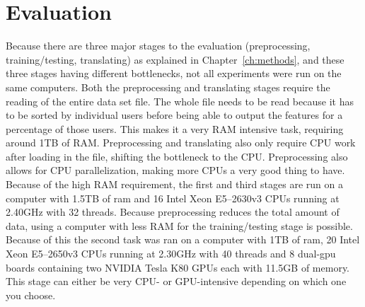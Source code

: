 \chapter{Evaluation}\label{ch:evaluation}

Because there are three major stages to the evaluation (preprocessing, training/testing, translating) as explained in Chapter~\ref{ch:methods}, and these three stages having different bottlenecks, not all experiments were run on the same computers. Both the preprocessing and translating stages require the reading of the entire data set file. The whole file needs to be read because it has to be sorted by individual users before being able to output the features for a percentage of those users. This makes it a very RAM intensive task, requiring around 1TB of RAM. Preprocessing and translating also only require CPU work after loading in the file, shifting the bottleneck to the CPU. Preprocessing also allows for CPU parallelization, making more CPUs a very good thing to have. Because of the high RAM requirement, the first and third stages are run on a computer with 1.5TB of ram and 16 Intel Xeon E5--2630v3 CPUs running at 2.40GHz with 32 threads. Because preprocessing reduces the total amount of data, using a computer with less RAM for the training/testing stage is possible. Because of this the second task was ran on a computer with 1TB of ram, 20 Intel Xeon E5--2650v3 CPUs running at 2.30GHz with 40 threads and 8 dual-gpu boards containing two NVIDIA Tesla K80 GPUs each with 11.5GB of memory. This stage can either be very CPU- or GPU-intensive depending on which one you choose.

